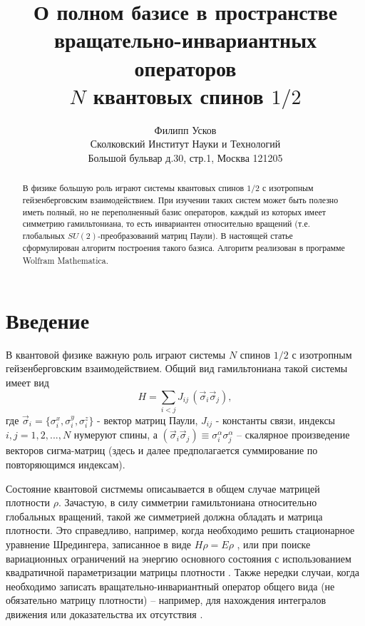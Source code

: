 \documentclass[]{article}
\title{О полном базисе  в пространстве \\ вращательно-инвариантных операторов \\ $N$ квантовых спинов $1/2$}
\author{Филипп Усков \\ {\small Сколковский Институт Науки и Технологий}\\
{\small Большой бульвар д.30, стр.1,
Москва 121205}}
\renewcommand{\[}{\begin{equation}}
\renewcommand{\]}{\end{equation}}
\begin{document}
\maketitle

\begin{abstract}
В физике большую роль играют системы квантовых спинов $1/2$ с изотропным гейзенберговским взаимодействием. При изучении таких систем может быть полезно иметь полный, но не переполненный базис операторов, каждый из которых имеет симметрию гамильтониана, то есть инвариантен относительно вращений (т.е. глобальных $SU(2)$-преобразований матриц Паули).	
В настоящей статье сформулирован алгоритм построения такого базиса. Алгоритм реализован в программе Wolfram Mathematica\textsuperscript{\textcopyright}.

\end{abstract}

\section{Введение}

В квантовой физике важную роль играют системы $N$ спинов $1/2$ с изотропным гейзенберговским взаимодействием. Общий вид гамильтониана такой системы имеет вид
\[
H=\sum_{i< j}J_{ij}\,(\vec\sigma_i\vec\sigma_j),
\label{k1}
\]
где $\vec\sigma_i = \{\sigma_i^x,\sigma_i^y,\sigma_i^z\}$ - вектор матриц Паули, $J_{ij}$ - константы связи,   индексы $i,j=1,2,...,N$ нумеруют спины, а $(\vec\sigma_i\vec\sigma_j)\equiv \sigma_i^\alpha \sigma_j^\alpha$ -- скалярное произведение векторов сигма-матриц (здесь и далее предполагается суммирование по повторяющимся индексам).

Состояние квантовой  систмемы описаывается в общем случае матрицей плотности $\rho$. Зачастую, в силу симметрии гамильтониана относительно глобальных вращений, такой же симметрией должна обладать и матрица плотности. Это справедливо, например, когда необходимо решить стационарное уравнение Шредингера, записанное в виде $ H\rho = E\rho $ \cite{USH}, или при поиске вариационных ограничений на энергию основного состояния \cite{variational} с использованием квадратичной параметризации матрицы плотности \cite{kvadro}.   Также нередки случаи, когда необходимо записать вращательно-инвариантный оператор общего вида (не обязательно матрицу плотности) -- например, для нахождения интегралов движения \cite{basisF} или доказательства их отсутствия \cite{Shiraishi}.  
\end{document}
